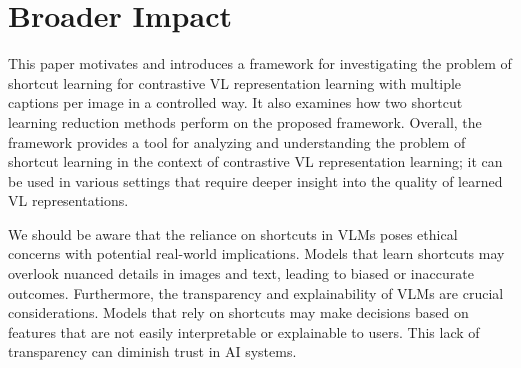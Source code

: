 
\section{Broader Impact}
This paper motivates and introduces a framework for investigating the problem of shortcut learning for contrastive \ac{VL} representation learning with multiple captions per image in a controlled way.
It also examines how two shortcut learning reduction methods perform on the proposed framework.
Overall, the framework provides a tool for analyzing and understanding the problem of shortcut learning in the context of contrastive \ac{VL} representation learning; it can be used in various settings that require deeper insight into the quality of learned \ac{VL} representations.


We should be aware that the reliance on shortcuts in \acp{VLM} poses ethical concerns with potential real-world implications. 
Models that learn shortcuts may overlook nuanced details in images and text, leading to biased or inaccurate outcomes. 
Furthermore, the transparency and explainability of \acp{VLM} are crucial considerations. 
Models that rely on shortcuts may make decisions based on features that are not easily interpretable or explainable to users. 
This lack of transparency can diminish trust in AI systems.

